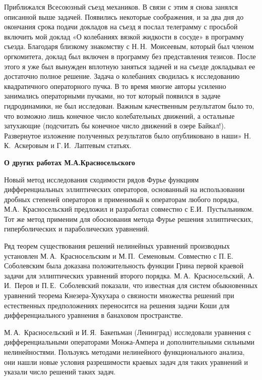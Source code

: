 Приближался Всесоюзный съезд механиков. В связи с этим я снова занялся описанной выше задачей. Появились некоторые соображения, и за два дня до окончания срока подачи докладов на съезд я послал телеграмму с просьбой включить мой доклад «О колебаниях вязкой жидкости в сосуде» в программу съезда. Благодаря близкому знакомству с Н.\,Н.~Моисеевым, который был членом оргкомитета, доклад был включен в программу без представления тезисов. После этого я уже был вынужден вплотную заняться задачей и на съезде докладывал ее достаточно полное решение. Задача о колебаниях сводилась к исследованию квадратичного операторного пучка. В то время многие авторы усиленно занимались операторными пучками, но тот который появился в задаче гидродинамики, не был исследован. Важным качественным результатом было то, что возможно лишь конечное число колебательных движений, а остальные затухающие (подсчитать бы конечное число движений в озере Байкал!). Развернутое изложение полученных результатов было опубликовано в наши» Н.\,К.~Аскеровым и Г.\,И.~Лаптевым статьях.

{\bf О других работах М.А.Красносельского}

Новый метод исследования сходимости рядов Фурье фу\-н\-к\-ци\-ям дифференциальных эллиптических операторов,
основанный на  использовании дробных степеней операторов и применимый к операторам любого порядка,
М.А.~Красносельский предложил и разработал совместно с Е.И.~Пустыльником.  Тот же метод применим для обоснования метода Фурье
решения эллиптических, гиперболических и параболических уравнений.

Ряд теорем существования решений нелинейных уравнений производных установлен М.\,А.~Красносельским и
\linebreak
М.\,П.~Семеновым.
Совместно с П.\,Е. Соболевским  была доказана
положительность функции Грина первой краевой задачи для эллиптических уравнений второго порядка.
\linebreak
М.\,А.~Красносельский, А.\,И.~Перов и П.\,Е.~Соболевский показали,
что известная для систем обыкновенных уравнений теорема Кне\-зе\-ра-Ху\-ку\-ха\-ра о связности множества решений при естественных предположениях переносится на решения задачи Коши для дифференциального уравнения в банаховом пространстве.

М.\,А.~Красносельский и И.\,Я.~Бакепьман (Ленинград) исследовали уравнения с дифференциальными операторами Монжа-Ампера и дополнительными сильными нелинейностями. Пользуясь методами нелинейного функционального анализа, они нашли новые условия разрешимости краевых задач для таких уравнений и указали число решений таких задач.


